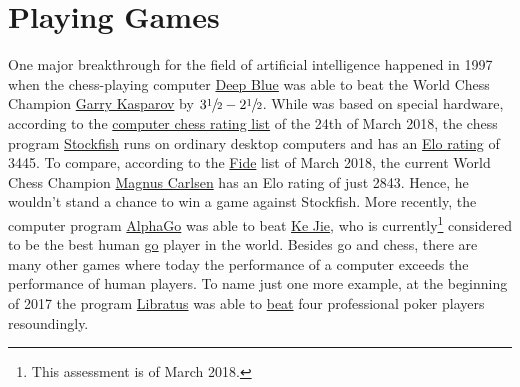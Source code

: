 \chapter{Playing Games}
One major breakthrough for the field of artificial intelligence happened in 1997 when the chess-playing computer
\href{https://en.wikipedia.org/wiki/Deep_Blue_(chess_computer)}{Deep Blue} was able to beat the World Chess
Champion \href{https://en.wikipedia.org/wiki/Garry_Kasparov}{Garry Kasparov} by $3\sfrac{1}{2}-2\sfrac{1}{2}$.
While  was based on special hardware, according to the
\href{http://www.computerchess.org.uk/ccrl/4040/rating_list_all.html}{computer chess rating list} of the 24th
of March 2018, the chess program \href{https://en.wikipedia.org/wiki/Stockfish_(chess)}{Stockfish} runs
on ordinary desktop computers and has an \href{https://en.wikipedia.org/wiki/Elo_rating_system}{Elo rating} of 3445.  
To compare, according to the
\href{https://ratings.fide.com/top.phtml?list=men}{Fide} list of March 2018, the current 
World Chess Champion \href{https://en.wikipedia.org/wiki/Magnus_Carlsen}{Magnus Carlsen} has an Elo rating of
just 2843.  Hence, he wouldn't stand a chance to win a game against Stockfish.  More recently, the computer program
\href{https://en.wikipedia.org/wiki/AlphaGo}{AlphaGo} was able to beat
\href{https://en.wikipedia.org/wiki/Ke_Jie}{Ke Jie}, who is currently\footnote{This assessment is of March 2018.} 
considered to be the best human \href{https://en.wikipedia.org/wiki/Go_(game)}{go} player in the world.
Besides go and chess, there are many other games where today the performance of a computer exceeds the
performance of human players.  To name just one more example, at the beginning of 2017 the program
\href{https://en.wikipedia.org/wiki/Libratus}{Libratus} was able to  
\href{https://www.engadget.com/2017/01/31/libratus-the-poker-playing-ai-destroyed-its-four-human-rivals/}{beat}
four professional poker players resoundingly.

